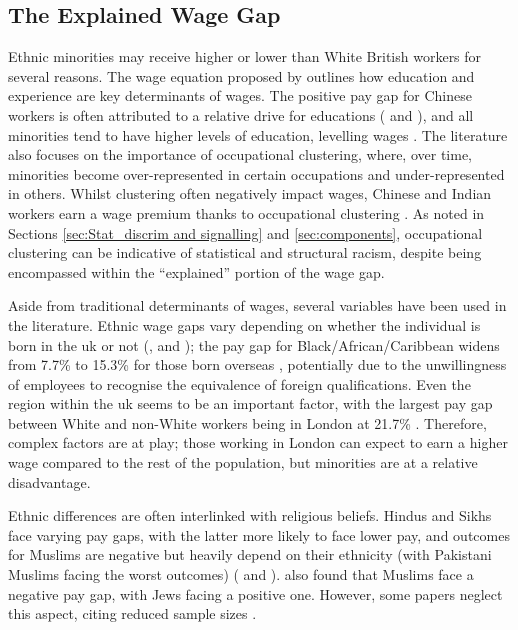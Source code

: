 \documentclass[class=article, crop=false]{standalone}
\begin{document}
\subsection{The Explained Wage Gap}
Ethnic minorities may receive higher or lower than White British workers for several reasons. The wage equation proposed by \citet{MincerA} outlines how education and experience are key determinants of wages. The positive pay gap for Chinese workers is often attributed to a relative drive for educations (\citet{Leslie} and \citet{Berthoud}), and all minorities tend to have higher levels of education, levelling wages \citep{Longhi2}. The literature also focuses on the importance of occupational clustering, where, over time, minorities become over-represented in certain occupations and under-represented in others. Whilst clustering often negatively impact wages, Chinese and Indian workers earn a wage premium thanks to occupational clustering \citep{Brynin}. As noted in Sections \ref{sec:Stat_discrim and signalling} and \ref{sec:components}, occupational clustering can be indicative of statistical and structural racism, despite being encompassed within the \enquote{explained} portion of the wage gap.

Aside from traditional determinants of wages, several variables have been used in the literature. Ethnic wage gaps vary depending on whether the individual is born in the \acrshort{uk} or not (\citet{Brynin}, \citet{ONSe} and \citet{Shields}); the pay gap for Black/African/Caribbean widens from 7.7\% to 15.3\% for those born overseas \citep{ONSe}, potentially due to the unwillingness of employees to recognise the equivalence of foreign qualifications. Even the region within the \acrshort{uk} seems to be an important factor, with the largest pay gap between White and non-White workers being in London at 21.7\% \citep{ONSe}. Therefore, complex factors are at play; those working in London can expect to earn a higher wage compared to the rest of the population, but minorities are at a relative disadvantage.

Ethnic differences are often interlinked with religious beliefs. Hindus and Sikhs face varying pay gaps, with the latter more likely to face lower pay, and outcomes for Muslims are negative but heavily depend on their ethnicity (with Pakistani Muslims facing the worst outcomes) (\citet{Johnston} and \citet{Longhi}). \citep{Metcalf} also found that Muslims face a negative pay gap, with Jews facing a positive one. However, some papers neglect this aspect, citing reduced sample sizes \citep{Brynin}.
\end{document}
